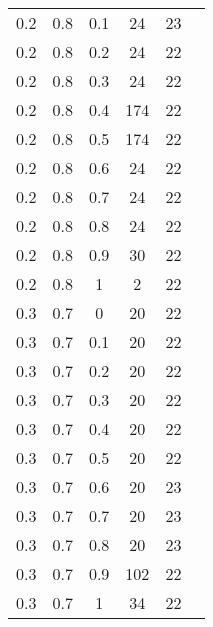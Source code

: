 \documentclass[a4paper,14pt]{extreport}
\begin{document}
\begin{table}
\begin{minipage}[h!]{0.10\hsize}
\begin{center}
{\begin{tabular}{c@{\hspace{5mm}}c@{\hspace{5mm}}c@{\hspace{5mm}}c@{\hspace{5mm}}c@{\hspace{5mm}}c}
					0.2     &0.8    &0.1    &24    &23\\
					0.2     &0.8    &0.2    &24    &22\\
					0.2     &0.8    &0.3    &24    &22\\
					0.2     &0.8    &0.4    &174   &22\\
					0.2     &0.8    &0.5    &174   &22\\
					0.2     &0.8    &0.6    &24    &22\\
					0.2     &0.8    &0.7    &24    &22\\
					0.2     &0.8    &0.8    &24    &22\\
					0.2     &0.8    &0.9    &30    &22\\
					0.2     &0.8    &1      &2     &22\\
					\midrule
					0.3     &0.7    &0      &20    &22\\
					0.3     &0.7    &0.1    &20    &22\\
					0.3     &0.7    &0.2    &20    &22\\
					0.3     &0.7    &0.3    &20    &22\\
					0.3     &0.7    &0.4    &20    &22\\
					0.3     &0.7    &0.5    &20    &22\\
					0.3     &0.7    &0.6    &20    &23\\
					0.3     &0.7    &0.7    &20    &23\\
					0.3     &0.7    &0.8    &20    &23\\
					0.3     &0.7    &0.9    &102   &22\\
					0.3     &0.7    &1      &34    &22\\
					\bottomrule
			\end{tabular}}
			\label{T:log111}
		\end{center}
	\end{minipage}
	\hfill
	\begin{minipage}[!h]{0.50\hsize}\centering
		\begin{center}
\end{center}
\end{minipage}
\end{table}
\end{document}

